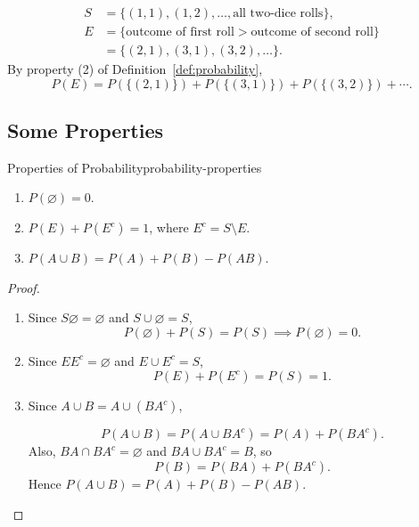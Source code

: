 \begin{example}
  \begin{align*}
    S & =\{(1,1),(1,2),\ldots,\text{all two-dice rolls}\},              \\
    E & =\{\text{outcome of first roll}>\text{outcome of second roll}\} \\
      & =\{(2,1),(3,1),(3,2),\ldots\}.
  \end{align*}
  By property (2) of Definition~\ref{def:probability},
  \[
    P(E)=P(\{(2,1)\})+P(\{(3,1)\})+P(\{(3,2)\})+\cdots.
  \]
\end{example}

\subsection{Some Properties}

\begin{theorem}{Properties of Probability}{probability-properties}
  \begin{enumerate}
    \item $P(\varnothing)=0$.
    \item $P(E)+P(E^c)=1$, where $E^c=S\setminus E$.
    \item $P(A\cup B)=P(A)+P(B)-P(AB)$.
  \end{enumerate}
\end{theorem}

\begin{proof}
  \begin{enumerate}
    \item Since $S\varnothing=\varnothing$ and $S\cup\varnothing=S$,
          \[
            P(\varnothing)+P(S)=P(S)\implies P(\varnothing)=0.
          \]
    \item Since $EE^c=\varnothing$ and $E\cup E^c=S$,
          \[
            P(E)+P(E^c)=P(S)=1.
          \]
    \item Since $A\cup B=A\cup(BA^c)$,
          \begin{center}
          \end{center}
          \[
            P(A\cup B)=P(A\cup BA^c)=P(A)+P(BA^c).
          \]
          Also, $BA\cap BA^c=\varnothing$ and $BA\cup BA^c=B$, so
          \[
            P(B)=P(BA)+P(BA^c).
          \]
          Hence $P(A\cup B)=P(A)+P(B)-P(AB)$.\qedhere
  \end{enumerate}
\end{proof}

